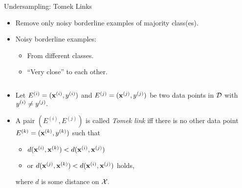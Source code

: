 \documentclass[11pt,compress,t,notes=noshow, xcolor=table]{beamer}
\begin{document}
\begin{frame}{Undersampling: Tomek Links}
    \small{

        \begin{itemize}            
            \item Remove only noisy borderline examples of majority class(es).
            \item Noisy borderline examples:
            \begin{itemize}
                \footnotesize
                \item From different classes.
                \item ``Very close'' to each other.
            \end{itemize} 
                
        \end{itemize}
        \begin{columns}
            \begin{column}{0.6\textwidth}	
        
                \begin{itemize}
                    \item Let $E^{(i)} = (\mathbf{x}^{(i)},y^{(i)})$ and $E^{(j)} = (\mathbf{x}^{(j)},y^{(j)})$ be two data points in $\mathcal{D}$ with $y^{(i)}\neq y^{(j)}.$
                    \vspace{10pt}
                    
                    \item A pair $(E^{(i)},E^{(j)})$ is called \emph{Tomek link} iff there is no other data point $E^{(k)} = (\mathbf{x}^{(k)},y^{(k)})$ such that
        
                    \begin{itemize} 
                    \footnotesize
                
                       \item [] $d(\mathbf{x}^{(i)}, \mathbf{x}^{(k)}) < d(\mathbf{x}^{(i)}, \mathbf{x}^{(j)}) $
                       \item [] or $d(\mathbf{x}^{(j)}, \mathbf{x}^{(k)}) < d(\mathbf{x}^{(i)}, \mathbf{x}^{(j)}) $ holds,
                    
                    \end{itemize}
        
                where $d$ is some distance on $\mathcal{X}.$
                
                \end{itemize}		
            \end{column}
        

\end{columns}}
\end{frame}
\end{document}
